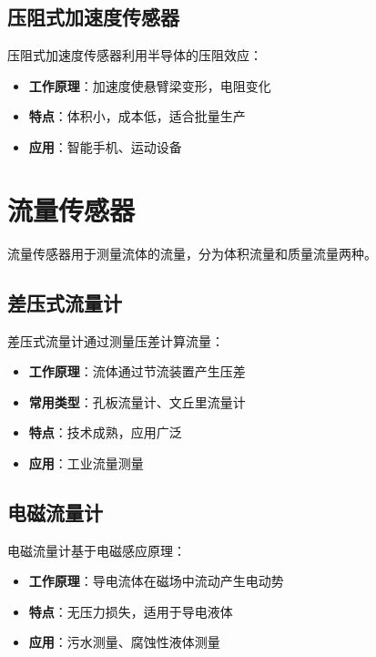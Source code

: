 \documentclass[12pt,UTF8]{ctexbook}
\begin{document}
\subsection{压阻式加速度传感器}

压阻式加速度传感器利用半导体的压阻效应：

\begin{itemize}[leftmargin=2cm]
	\item \textbf{工作原理}：加速度使悬臂梁变形，电阻变化
	\item \textbf{特点}：体积小，成本低，适合批量生产
	\item \textbf{应用}：智能手机、运动设备
\end{itemize}

\section{流量传感器}

流量传感器用于测量流体的流量，分为体积流量和质量流量两种。

\subsection{差压式流量计}

差压式流量计通过测量压差计算流量：

\begin{itemize}[leftmargin=2cm]
	\item \textbf{工作原理}：流体通过节流装置产生压差
	\item \textbf{常用类型}：孔板流量计、文丘里流量计
	\item \textbf{特点}：技术成熟，应用广泛
	\item \textbf{应用}：工业流量测量
\end{itemize}

\subsection{电磁流量计}

电磁流量计基于电磁感应原理：

\begin{itemize}[leftmargin=2cm]
	\item \textbf{工作原理}：导电流体在磁场中流动产生电动势
	\item \textbf{特点}：无压力损失，适用于导电液体
	\item \textbf{应用}：污水测量、腐蚀性液体测量
\end{itemize}
\end{document}
